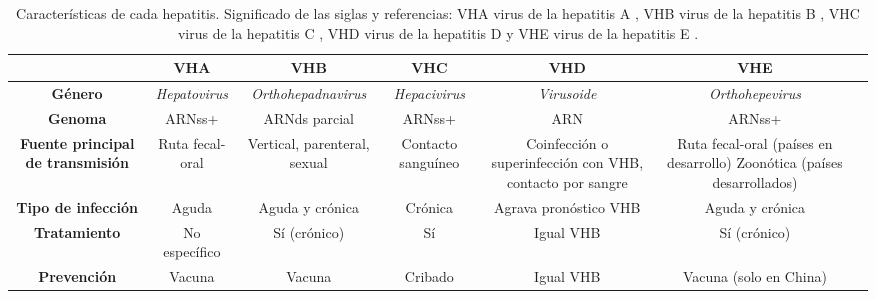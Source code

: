 \documentclass[11 pt]{article}
\begin{document}
\begin{table}[h!]
\begin{tabular}[c]{|c|c|c|c|c|c|c|}
	\hline
    	& {\bf VHA} & {\bf VHB} & {\bf VHC} & {\bf VHD} & {\bf VHE} \\
	\hline
	{\bf Género} & {\em Hepatovirus} & {\em Orthohepadnavirus}&{\em Hepacivirus}&{\em Virusoide}&{\em Orthohepevirus} \\
	\hline
	{\bf Genoma} & ARNss+ & ARNds parcial & ARNss+ & ARN & ARNss+\\
	\hline
	\parbox[c]{2 cm}{{\bf Fuente principal de transmisión}}
 & Ruta fecal-oral & \parbox[c]{2 cm}{Vertical, parenteral, sexual} & \parbox[c]{2 cm}{Contacto sanguíneo} & \parbox[c]{2 cm}{Coinfección o superinfección con VHB, contacto por sangre} & \parbox[c]{2 cm}{Ruta fecal-oral (países en desarrollo) Zoonótica (países desarrollados)}\\
	\hline 
	\parbox[c]{1.75 cm}{{\bf Tipo de infección}} & Aguda & Aguda y crónica & Crónica & \parbox[c]{2 cm}{Agrava pronóstico VHB} & Aguda y crónica\\
	\hline
	{\bf Tratamiento} & No específico & Sí (crónico) & Sí & Igual VHB & Sí (crónico)\\
	\hline
	{\bf Prevención} & Vacuna & Vacuna & Cribado & Igual VHB & \parbox[c]{2 cm}{Vacuna (solo en China)}\\
	\hline
\end{tabular}
\caption{Características de cada hepatitis. Significado de las siglas y referencias: VHA virus de la hepatitis A \cite{Thuener2017}, VHB virus de la hepatitis B \cite{You2014}, VHC virus de la hepatitis C \cite{Li2015}, VHD virus de la hepatitis D \cite{Rizzetto2015} y VHE virus de la hepatitis E \cite{Mohsen2017}.}
\label{tablahepatitis}
\end{table}
\end{document}
